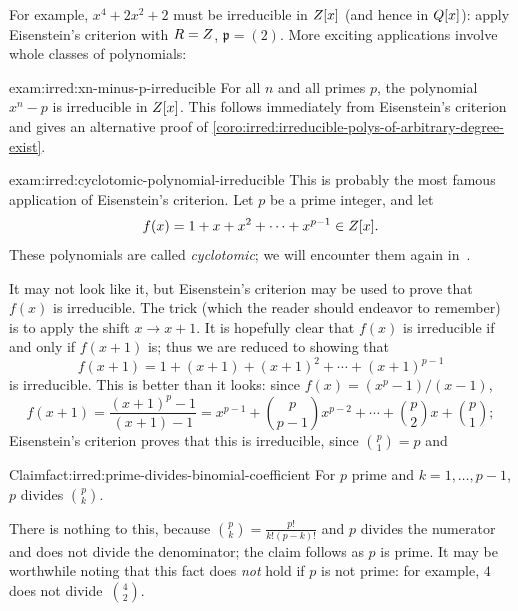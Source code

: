 For example, $x^4 + 2x^2 + 2$ must be irreducible in $Z[x]$ (and
hence in $Q[x]$): apply Eisenstein's criterion with $R = Z$,
$\mathfrak{p} = (2)$. More exciting applications involve whole classes
of polynomials:

\begin{exam}{}{exam:irred:xn-minus-p-irreducible}
  For all $n$ and all primes $p$, the polynomial $x^n - p$ is
  irreducible in $Z[x]$. This follows immediately from Eisenstein's
  criterion and gives an alternative proof of \cref{coro:irred:irreducible-polys-of-arbitrary-degree-exist}.
\end{exam}

\begin{exam}{}{exam:irred:cyclotomic-polynomial-irreducible}
  This is probably the most famous application of Eisenstein's
  criterion.  Let $p$ be a prime integer, and let
  \[f(x) = 1 + x + x^2 + \cdots + x^{p-1} \in Z[x].\] These
  polynomials are called \emph{cyclotomic}; we will encounter them
  again in~.

  It may not look like it, but Eisenstein's criterion may be used to
  prove that $f(x)$ is irreducible. The trick (which the reader should
  endeavor to remember) is to apply the shift $x \to x + 1$. It is
  hopefully clear that $f(x)$ is irreducible if and only if $f(x + 1)$
  is; thus we are reduced to showing that
  \[f(x + 1) = 1 + (x + 1) + (x + 1)^2 + \cdots + (x + 1)^{p-1}\] is
  irreducible. This is better than it looks: since
  $f(x) = (x^p - 1)/(x - 1)$,
  \[f(x + 1) = \frac{(x + 1)^p - 1}{(x + 1) - 1} = x^{p-1} +
    \binom{p}{p-1} x^{p-2} + \cdots + \binom{p}{2} x + \binom{p}{1};\]
  Eisenstein's criterion proves that this is irreducible, since
  $\binom{p}{1} = p$ and

\begin{fact}{Claim}{fact:irred:prime-divides-binomial-coefficient}
  For $p$ prime and $k = 1, \ldots, p - 1$, $p$ divides
  $\binom{p}{k}$.
\end{fact}

There is nothing to this, because
$\binom{p}{k} = \frac{p!}{k!(p - k)!}$ and $p$ divides the numerator
and does not divide the denominator; the claim follows as $p$ is
prime. It may be worthwhile noting that this fact does \emph{not} hold
if $p$ is not prime: for example, $4$ does not divide~$\binom{4}{2}$.
\end{exam}

